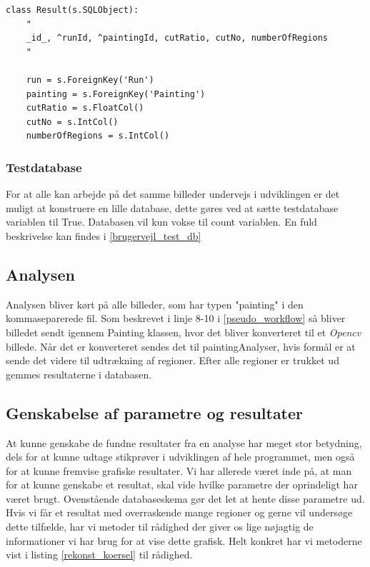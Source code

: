 {\begin{lstlisting}[caption={Pythonkode for oprettelse af \emph{foreign
    keys} i databasen.}, captionpos=b, label={code_tabel_result}, frame=tb,
    breaklines=false, float=h]
class Result(s.SQLObject):
    "
    _id_, ^runId, ^paintingId, cutRatio, cutNo, numberOfRegions
    "

    run = s.ForeignKey('Run')
    painting = s.ForeignKey('Painting')
    cutRatio = s.FloatCol()
    cutNo = s.IntCol()
    numberOfRegions = s.IntCol()
\end{lstlisting}
\subsubsection{Testdatabase}\label{test_db}
For at alle kan arbejde på det samme billeder undervejs i udviklingen er
det muligt at konstruere en lille database, dette gøres ved at sætte
testdatabase variablen til True. Databasen vil kun vokse til count
variablen. En fuld beskrivelse kan findes i \ref{brugervejl_test_db}


\subsection{Analysen}
Analysen bliver kørt på alle billeder, som har typen "painting" i den
kommaseparerede fil. Som beskrevet i linje 8-10 i \ref{pseudo_workflow}
så bliver billedet sendt igennem Painting klassen, hvor det bliver
konverteret til et \emph{Opencv} billede. Når det er konverteret sendes
det til paintingAnalyser, hvis formål er at sende det videre til
udtrækning af regioner. Efter alle regioner er trukket ud gemmes
resultaterne i databasen.

\subsection{Genskabelse af parametre og resultater}
At kunne genskabe de fundne resultater fra en analyse har meget stor
betydning, dels for at kunne udtage stikprøver i udviklingen af hele
programmet, men også for at kunne fremvise grafiske resultater. Vi har
allerede været inde på, at man for at kunne genskabe et resultat, skal
vide hvilke parametre der oprindeligt har været brugt. Ovenstående
databaseskema gør det let at hente disse parametre ud. Hvis vi får et
resultat med overraskende mange regioner og gerne vil undersøge dette
tilfælde, har vi metoder til rådighed der giver os lige nøjagtig de
informationer vi har brug for at vise dette grafisk. Helt konkret har vi
metoderne vist i listing \ref{rekonst_koersel} til rådighed.

}
